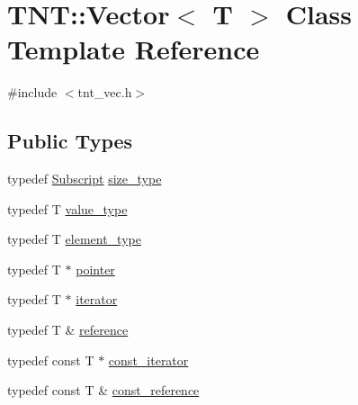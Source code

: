 \hypertarget{classTNT_1_1Vector}{}\section{T\+NT\+:\+:Vector$<$ T $>$ Class Template Reference}
\label{classTNT_1_1Vector}


{\ttfamily \#include $<$tnt\+\_\+vec.\+h$>$}

\subsection*{Public Types}
\begin{DoxyCompactItemize}
\item 
typedef \hyperlink{namespaceTNT_af22e3f1460e145c04ce4e7d701e4c1c1}{Subscript} \hyperlink{classTNT_1_1Vector_adf52e96536358fcc4507fd08402aa07f}{size\+\_\+type}
\item 
typedef T \hyperlink{classTNT_1_1Vector_a329d23fe25894a94d461353dd9c7c1be}{value\+\_\+type}
\item 
typedef T \hyperlink{classTNT_1_1Vector_af87934ec2406d242f6cc98035686bd1f}{element\+\_\+type}
\item 
typedef T $\ast$ \hyperlink{classTNT_1_1Vector_aacdf3935ca58837be7e80d21d8e17c6d}{pointer}
\item 
typedef T $\ast$ \hyperlink{classTNT_1_1Vector_a7289b2334c4c28181bb4193fa32fc48a}{iterator}
\item 
typedef T \& \hyperlink{classTNT_1_1Vector_a9cdf62749080406bdf3fbace264dac85}{reference}
\item 
typedef const T $\ast$ \hyperlink{classTNT_1_1Vector_a9a825ae9b3cb568a7b02449da6e9779f}{const\+\_\+iterator}
\item 
typedef const T \& \hyperlink{classTNT_1_1Vector_a2957faed9560f1f53bc5943a160d71bf}{const\+\_\+reference}
\end{DoxyCompactItemize}
